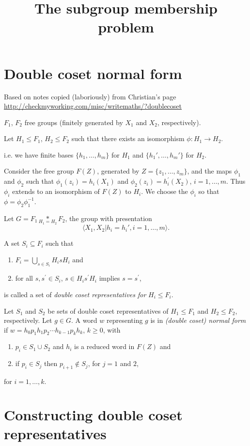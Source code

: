 \documentclass[a4paper,12pt]{article}
\title{The subgroup membership problem
}
\author{ 
}
\numberwithin{equation}{section}
\numberwithin{figure}{section}
\newcommand{\la}{\langle}
\newcommand{\ra}{\rangle}
\newcommand{\be}{\begin{enumerate}}
\newcommand{\ee}{\end{enumerate}}
\begin{document}
\maketitle
\section{Double coset normal form}
Based on notes copied (laboriously) from Christian's page 
\url{
http://checkmyworking.com/misc/writemaths/?doublecoset
}

$F_1$, $F_2$ free groups (finitely generated by $X_1$ 
and $X_2$, respectively).

Let $H_1 \leq F_1$, $H_2 \leq F_2$ such that 
there exists an isomorphism $\phi: H_1 \rightarrow H_2$.

i.e. we have finite bases $\{h_1, \ldots, h_m \}$  for $H_1$ and 
$\{h_1', \ldots, h_m'\}$ for $H_2$.

Consider the free group $F(Z)$, generated by $Z=\{z_1, \ldots, z_m\}$, 
and the maps $\phi_1$ and $\phi_2$ such that 
$\phi_1(z_i)=h_i(X_1)  $ and  $\phi_2(z_i)=h^\prime_i(X_2)$, $i=1,\ldots ,m$.
Thus $\phi_i$ extends to an isomorphism of $F(Z)$ to $H_i$. We choose
the $\phi_i$ so that $\phi=\phi_2\phi_1^{-1}$.  

Let ${G = F_1 \underset{H_1=H_2}{\ast} F_2}$, the group with  
 presentation \[\la X_1,X_2 | h_i = h_i', i=1, \ldots ,m\ra.\]

A  set $S_i \subseteq F_i$ such that
\be 
\item
$F_i = \displaystyle{\bigcup_{s \in S_i} H_isH_i}$ 
and 
\item
for all $s, s^\prime \in S_i$, $s\in H_i s^\prime H_i$ 
implies $s=s^\prime$,
\ee
is called a set of \emph{double coset representatives for} $H_i\le F_i$. 

Let $S_1$ and $S_2$ be sets of  double coset representatives of 
$H_1\le F_1$ and $H_2\le F_2$, respectively. Let $g \in G$. 
A word $w$ representing $g$ is in \emph{(double coset) normal form} if 
$w = h_{0}p_1h_{1}p_2 \cdots h_{k-1}p_kh_{{k}}$, $k\ge 0$,  with
\be
\item $p_i \in S_1\cup S_2$  and $h_i$ is a reduced word in $F(Z)$ and
\item if $p_i\in S_j$ then $p_{i+1}\notin S_j$, for $j=1$ and $2$,
\ee
for $i = 1, \ldots ,k$.
\section{Constructing double coset representatives}
\end{document}
